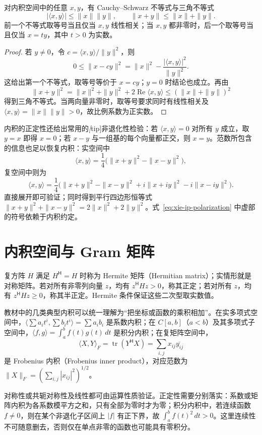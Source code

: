 \begin{theorem}
\label{thm:xie-ip-cauchy}
对内积空间中的任意 $x,y$，有 Cauchy--Schwarz 不等式与三角不等式
\[
|\langle x,y\rangle|\leq\|x\|\|y\|,
\qquad \|x+y\|\leq\|x\|+\|y\|.
\]
前一个不等式取等号当且仅当 $x,y$ 线性相关；当 $x,y$ 都非零时，后一个取等号当且仅当 $x=ty$，其中 $t>0$ 为实数。
\end{theorem}
\begin{proof}
若 $y\ne0$，令 $c=\langle x,y\rangle/\|y\|^2$，则
\[
0\leq\|x-cy\|^2
=\|x\|^2-\frac{|\langle x,y\rangle|^2}{\|y\|^2}.
\]
这给出第一个不等式，取等号等价于 $x=cy$；$y=0$ 时结论也成立。再由
\[
\|x+y\|^2=\|x\|^2+\|y\|^2+2\operatorname{Re}\langle x,y\rangle
\leq(\|x\|+\|y\|)^2
\]
得到三角不等式。当两向量非零时，取等号要求同时有线性相关及 $\langle x,y\rangle=\|x\|\|y\|>0$，故比例系数为正实数。
\end{proof}

内积的正定性还给出常用的\emph[tip]{非退化性检验}：若 $\langle x,y\rangle=0$ 对所有 $y$ 成立，取 $y=x$ 即得 $x=0$；若 $x-y$ 与一组基的每个向量都正交，则 $x=y$。范数所包含的信息也足以恢复内积：实空间中
\[
\langle x,y\rangle=\frac14\bigl(\|x+y\|^2-\|x-y\|^2\bigr),
\]
复空间中则为
\begin{equation}
\label{eq:xie-ip-polarization}
\langle x,y\rangle=\frac14\bigl(\|x+y\|^2-\|x-y\|^2
+i\|x+iy\|^2-i\|x-iy\|^2\bigr).
\end{equation}
直接展开即可验证；同时得到平行四边形恒等式 $\|x+y\|^2+\|x-y\|^2=2\|x\|^2+2\|y\|^2$。式~\eqref{eq:xie-ip-polarization} 中虚部的符号依赖于内积约定。

\section{内积空间与 Gram 矩阵}
\label{sec:xie-ip-gram}

\begin{definition}
复方阵 $H$ 满足 $H^{\mathsf H}=H$ 时称为 Hermite 矩阵（Hermitian matrix）；实情形就是对称矩阵。若对所有非零列向量 $z$，均有 $z^{\mathsf H}Hz>0$，称其正定；若对所有 $z$，均有 $z^{\mathsf H}Hz\geq0$，称其半正定。Hermite 条件保证这些二次型取实数值。
\end{definition}

\begin{example}
教材中的几类典型内积可以统一理解为“把坐标或函数的乘积相加”。在实多项式空间中，$\langle\sum a_it^i,\sum b_it^i\rangle=\sum a_ib_i$ 是系数内积；在 $C[a,b]$（$a<b$）及其多项式子空间中，$\langle f,g\rangle=\int_a^bf(t)g(t)\,dt$ 是积分内积；在复矩阵空间中，
\[
\langle X,Y\rangle_F=\operatorname{tr}(Y^{\mathsf H}X)
=\sum_{i,j}x_{ij}\overline{y_{ij}}
\]
是 Frobenius 内积（Frobenius inner product），对应范数为 $\|X\|_F=(\sum_{i,j}|x_{ij}|^2)^{1/2}$。
\end{example}
\begin{solve}
对称性或共轭对称性及线性都可由运算性质验证。正定性需要分别落实：系数或矩阵内积为各系数模平方之和，只有全部为零时才为零；积分内积中，若连续函数 $f\ne0$，则在某个非退化子区间上 $|f|$ 有正下界，故 $\int_a^bf(t)^2\,dt>0$。这里连续性不可随意删去，否则仅在单点非零的函数也可能具有零积分。
\end{solve}

